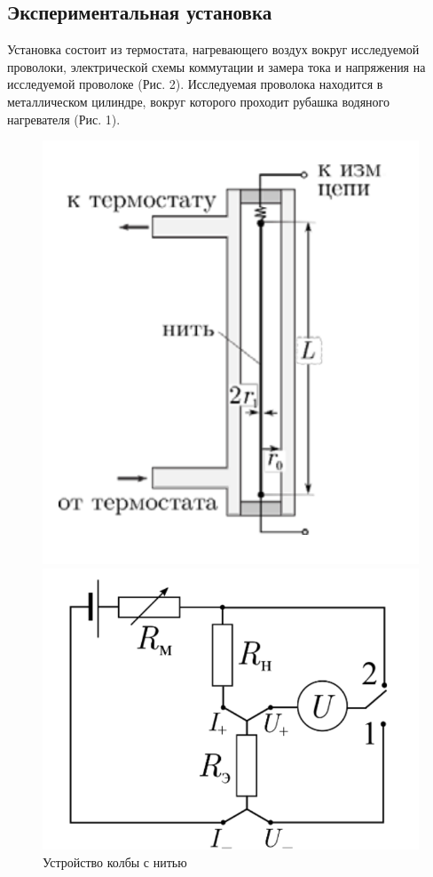 \documentclass[a4paper, 12pt]{article}%
\begin{document}
	\subsection{Экспериментальная установка}
		Установка состоит из термостата, нагревающего воздух вокруг исследуемой проволоки, электрической схемы коммутации и замера тока и напряжения на исследуемой проволоке (Рис. 2). Исследуемая проволока находится в металлическом цилиндре, вокруг которого проходит рубашка водяного нагревателя (Рис. 1).
		\begin{figure}[H]
			\begin{center}
				\begin{minipage}[h]{0.4\linewidth}
					\includegraphics[width=1\linewidth]{scheme}
					\caption{Устройство колбы с нитью} %
				\end{minipage}
				\hfill
				\begin{minipage}[h]{0.4\linewidth}
					\includegraphics[width=1\linewidth]{electric}

\end{minipage}
\end{center}
\end{figure}
\end{document}
